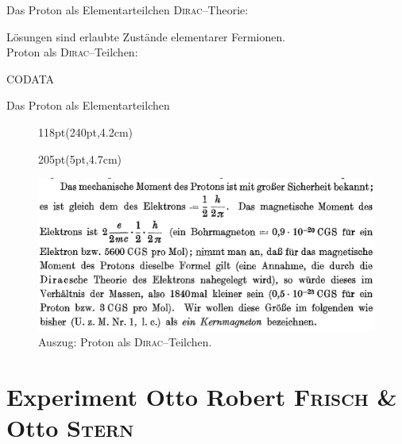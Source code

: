 \documentclass[t,9pt]{beamer}
\newcommand{\highlight}[3]{ \begin{textblock*}{#1}(#2,#3) \begin{tcolorbox} [enhanced,opacityfill=.1,colback=blue] \end{tcolorbox} \end{textblock*} } %
\begin{document}
        \begin{frame}{Das Proton als Elementarteilchen}
                \textsc{Dirac}--Theorie: 
                \begin{center}
                \end{center}
                Lösungen sind erlaubte Zustände elementarer Fermionen.
                \pause
                \\\vspace{.5cm} Proton als \textsc{Dirac}--Teilchen:
                \begin{center}
                \end{center}
                \tiny\vspace{-.2cm}\hspace{8.1cm}CODATA\cite{CODATA_nuclear_magneton}\normalsize
        \end{frame}

        \begin{frame}{Das Proton als Elementarteilchen}
                \begin{figure}
                        \highlight{118pt}{240pt}{4.2cm}
                        \highlight{205pt}{5pt}{4.7cm}
                        \includegraphics[width=\textwidth]{prosi_proton_als_dirac_teilchen.png}
                        \caption{Auszug: Proton als \textsc{Dirac}--Teilchen.\cite{FrischStern1933}}
                \end{figure}
        \end{frame}

        \section{Experiment Otto Robert \textsc{Frisch} \& Otto \textsc{Stern}} 
\end{document}
